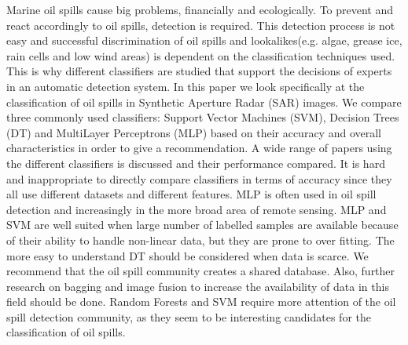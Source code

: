 Marine oil spills cause big problems, financially and ecologically. To prevent and react accordingly to oil spills, detection is required. This detection process is not easy and successful discrimination of oil spills and lookalikes(e.g. algae, grease ice, rain cells and low wind areas) is dependent on the classification techniques used. This is why different classifiers are studied that support the decisions of experts in an automatic detection system. In this paper we look specifically at the classification of oil spills in Synthetic Aperture Radar (SAR) images. We compare three commonly used classifiers: Support Vector Machines (SVM), Decision Trees (DT) and MultiLayer Perceptrons (MLP) based on their accuracy and overall characteristics in order to give a recommendation. A wide range of papers using the different classifiers is discussed and their performance compared. It is hard and inappropriate to directly compare classifiers in terms of accuracy since they all use different datasets and different features. MLP is often used in oil spill detection and increasingly in the more broad area of remote sensing. MLP and SVM are well suited when large number of labelled samples are available because of their ability to handle non-linear data, but they are prone to over fitting. The more easy to understand DT should be considered when data is scarce. We recommend that the oil spill community creates a shared database. Also, further research on bagging and image fusion to increase the availability of data in this field should be done. Random Forests and SVM require more attention of the oil spill detection community, as they seem to be interesting candidates for the classification of oil spills.
